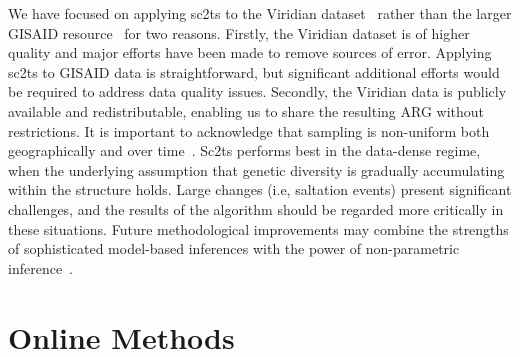 \documentclass[12pt]{article}
\begin{document}
We have focused on applying sc2ts to the Viridian dataset~\cite{Hunt2024} rather
than the larger GISAID resource~\cite{Shu2017} for two reasons.
Firstly, the Viridian dataset is of higher quality and major efforts
have been made to remove sources of error. Applying sc2ts to
GISAID data is straightforward, but significant additional efforts
would be required to address data quality issues.
Secondly, the Viridian data is publicly available and redistributable,
enabling us to share the resulting ARG without restrictions.
It is important to acknowledge that sampling is non-uniform both
geographically and over time~\cite{Lancet2021,Chen2022}.
Sc2ts performs best in the data-dense regime, when the underlying
assumption that genetic diversity is gradually accumulating within
the structure holds. Large changes (i.e, saltation events) present
significant challenges, and the results of the algorithm should
be regarded more critically in these situations.
Future methodological improvements may combine the strengths
of sophisticated model-based inferences with the power
of non-parametric inference~\cite{Bisschop2025likelihoods}.

\clearpage %

\section*{Online Methods}
\end{document}
